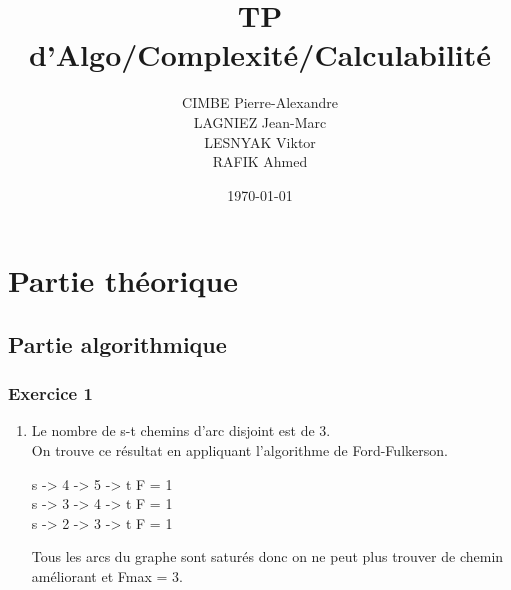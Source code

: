 \documentclass{article}
\title{TP d'Algo/Complexité/Calculabilité}
\author{
  CIMBE Pierre-Alexandre \\
  LAGNIEZ Jean-Marc \\
  LESNYAK Viktor \\
  RAFIK Ahmed}
\date\today
\begin{document}
\maketitle

\section{Partie théorique}
\subsection{Partie algorithmique}

\subsubsection{Exercice 1}

\begin{enumerate}

\item Le nombre de s-t chemins d'arc disjoint est de 3.\\
On trouve ce résultat en appliquant l'algorithme de Ford-Fulkerson.\\
\begin{center}
s -> 4 -> 5 -> t      F = 1\\
s -> 3 -> 4 -> t      F = 1\\
s -> 2 -> 3 -> t      F = 1\\
\end{center}
Tous les arcs du graphe sont saturés donc on ne peut plus trouver de chemin améliorant et Fmax = 3.\\



\end{enumerate}
\end{document}
